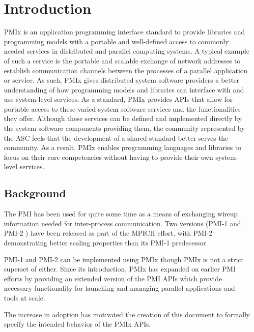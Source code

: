 \chapter{Introduction}

\label{chap:intro}

\ac{PMIx} is an application programming interface standard to provide
libraries and programming models with a portable and well-defined access to commonly
needed services in distributed and parallel computing systems.
A typical example of such a service is the portable and scalable exchange of network
addresses to establish communication channels between the processes of a parallel
application or service.
As such, \ac{PMIx} gives distributed system software providers a better understanding of how
programming models and libraries can interface with and use system-level services.
As a standard, \ac{PMIx} provides \acp{API} that allow for
portable access to these varied system software services and the
functionalities they offer.  Although these services can be defined and implemented directly by the
system software components providing them, the
community represented by the \ac{ASC}
feels that the development of a shared standard better serves the
community.
As a result, \ac{PMIx} enables programming languages and libraries to focus on their core
competencies without having to provide their own system-level services.

\section{Background}
\label{chap:introduction:background}

The \ac{PMI} has been used for quite some time as a means of exchanging wireup information needed for inter-process communication.
Two versions (PMI-1 and PMI-2 \cite{2010-Balaji-EuroMPI}) have been released as part of the MPICH effort, with PMI-2 demonstrating better scaling properties than its PMI-1 predecessor.

PMI-1 and PMI-2 can be implemented using \ac{PMIx} though \ac{PMIx} is not a strict superset of either.
Since its introduction, \ac{PMIx} has expanded
on earlier \ac{PMI} efforts by
providing an extended version of the \ac{PMI} \acp{API} which provide necessary functionality for launching and managing parallel applications and tools at scale.

The increase in adoption has motivated the creation of this document to formally specify the intended behavior of the \ac{PMIx} \acp{API}.

